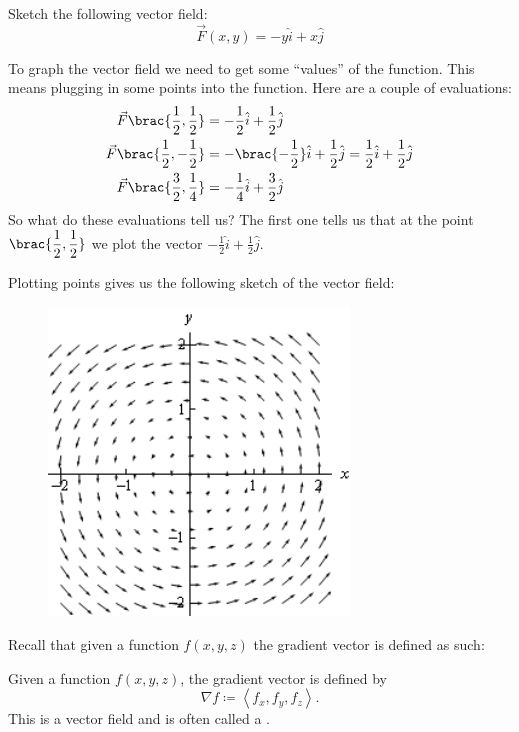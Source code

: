 \begin{exercise}{}{}
Sketch the following vector field:
\[ \vec{F}(x,y) = -y\hat{i} + x\hat{j} \]
\end{exercise}
\begin{solution}
To graph the vector field we need to get some ``values'' of the function. This means plugging in some points into the function. Here are a couple of evaluations:
\begin{align*}
\vec{F}\brac{{\frac{1}{2},\frac{1}{2}}} &=  -\frac{1}{2}\hat{i} + \frac{1}{2}\hat{j} \\
\vec{F}\brac{{\frac{1}{2},-\frac{1}{2}}} &=  -\brac{{-\frac{1}{2}}}\hat{i} + \frac{1}{2}\hat{j} = \frac{1}{2}\hat{i} + \frac{1}{2}\hat{j} \\
\vec{F}\brac{{\frac{3}{2},\frac{1}{4}}} &=  -\frac{1}{4}\hat{i} + \frac{3}{2}\hat{j}
\end{align*}
So what do these evaluations tell us? The first one tells us that at the point $\brac{\dfrac{1}{2},\dfrac{1}{2}}$ we plot the vector $-\frac{1}{2}\hat{i} + \frac{1}{2}\hat{j}$.

Plotting points gives us the following sketch of the vector field:

\begin{figure}[H]
    \centering
    \includegraphics[width=8cm]{images/vec_field2.png}
\end{figure}
\end{solution}

Recall that given a function $f(x,y,z)$ the gradient vector is defined as such:
\begin{definition}
Given a function $f(x,y,z)$, the gradient vector is defined by
\[ \nabla f\coloneqq\left\langle {{f_x},{f_y},{f_z}} \right\rangle. \]
This is a vector field and is often called a .
\end{definition}

